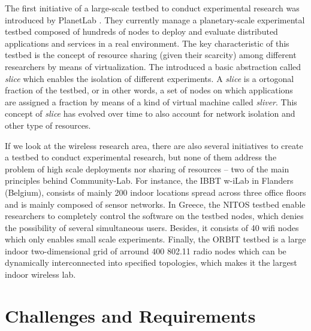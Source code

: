 \documentclass[conference]{IEEEtran}
\begin{document}
The first initiative of a large-scale testbed to conduct experimental research was introduced by PlanetLab \cite{planetlab}.
They currently manage a planetary-scale experimental testbed composed of hundreds of nodes to deploy and
evaluate distributed applications and services in a real environment. The key characteristic of this
testbed is the concept of resource sharing (given their scarcity) among different researchers by means of
virtualization. The introduced a basic abstraction called \textit{slice} which enables the isolation
of different experiments. A \textit{slice} is a ortogonal fraction 
of the testbed, or in other words, a set of nodes on which applications are assigned a fraction by means of a
kind of virtual machine called \textit{sliver}. This concept of \textit{slice} has evolved over time to also
account for network isolation and other type of resources.

If we look at the wireless research area, there are also several initiatives to create a testbed to conduct
experimental research, but none of them address the problem of high scale deployments nor sharing of resources -- two
of the main principles behind Community-Lab. For instance, the IBBT w-iLab \cite{ibbt} in Flanders (Belgium), 
consists of mainly 200 indoor locations spread across three office floors and is mainly composed of sensor networks. In
Greece, the NITOS \cite{nitos} testbed enable researchers to completely control the software on the testbed nodes, which denies 
the possibility of several simultaneous users. Besides, it consists of 40 wifi nodes which only enables 
small scale experiments. Finally, the ORBIT testbed \cite{orbit} is a large
indoor two-dimensional grid of arround 400 802.11 radio nodes which can be dynamically interconnected
into specified topologies, which makes it the largest indoor wireless lab.

\section{Challenges and Requirements}


\end{document}

